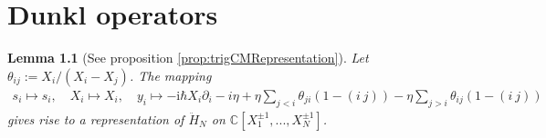\documentclass[11pt]{report}
\newtheorem{lemma}[theorem]{Lemma}
\theoremstyle{definition}
\theoremstyle{remark}
\theoremstyle{remark}
\newcommand{\C}{\mathbb{C}}
\newcommand{\I}{\mathrm{i}}
\begin{document}
\chapter{Dunkl operators}\label{appendix:dunklOperators}

\begin{lemma}[See proposition \ref{prop:trigCMRepresentation}]\label{lemma:trigCMRepresentationAppendix}
Let $\theta_{ij} := X_i/(X_i-X_j)$. The mapping
\begin{align*}
s_i \mapsto s_i, \quad X_i \mapsto X_i, \quad y_i \mapsto -\I \hbar X_i \partial_i - i \eta + \eta \sum_{j < i} \theta_{ji} (1-(i \ j)) - \eta \sum_{j > i} \theta_{ij} (1-(i \ j))
\end{align*}
gives rise to a representation of $\ddot H_N$ on $\C[X_1^{\pm 1},...,X_N^{\pm 1}]$.
\end{lemma}
\end{document}
